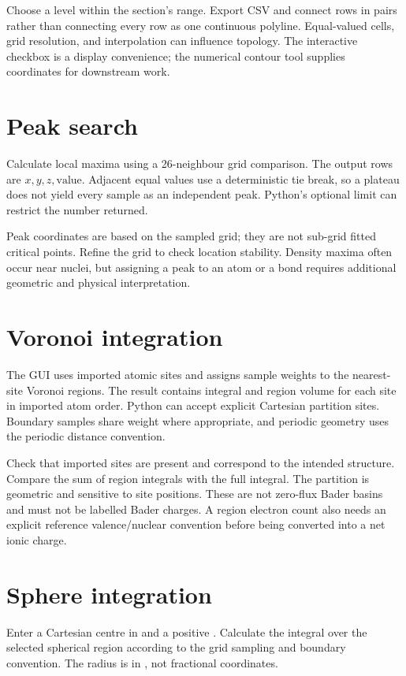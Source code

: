 Choose a level within the section's range. Export CSV and connect rows in pairs rather than connecting every row as one continuous polyline. Equal-valued cells, grid resolution, and interpolation can influence topology. The interactive  checkbox is a display convenience; the numerical contour tool supplies coordinates for downstream work.

\section{Peak search}
Calculate local maxima using a 26-neighbour grid comparison. The output rows are $x,y,z,\mathrm{value}$. Adjacent equal values use a deterministic tie break, so a plateau does not yield every sample as an independent peak. Python's optional limit can restrict the number returned.

Peak coordinates are based on the sampled grid; they are not sub-grid fitted critical points. Refine the grid to check location stability. Density maxima often occur near nuclei, but assigning a peak to an atom or a bond requires additional geometric and physical interpretation.

\section{Voronoi integration}
The GUI uses imported atomic sites and assigns sample weights to the nearest-site Voronoi regions. The result contains integral and region volume for each site in imported atom order. Python can accept explicit Cartesian partition sites. Boundary samples share weight where appropriate, and periodic geometry uses the periodic distance convention.

Check that imported sites are present and correspond to the intended structure. Compare the sum of region integrals with the full integral. The partition is geometric and sensitive to site positions. These are not zero-flux Bader basins and must not be labelled Bader charges. A region electron count also needs an explicit reference valence/nuclear convention before being converted into a net ionic charge.

\section{Sphere integration}
Enter a Cartesian centre in  and a positive . Calculate the integral over the selected spherical region according to the grid sampling and boundary convention. The radius is in \angstrom, not fractional coordinates.


